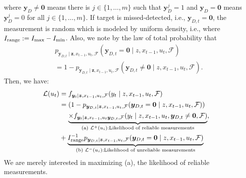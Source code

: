 \documentclass[letterpaper, 10 pt, conference]{ieeeconf}
\newcommand{\rood}[1]{{\color{red}{[#1]}}}
\begin{document}
where $\bm{y}_D \neq \mathbf{0}$ means there is $j \in \lbrace 1,\dots,m \rbrace$ such that $\bm{y}_D^j = 1$ and $\bm{y}_D = \mathbf{0}$ means $\bm{y}_D^j = 0$ for all $j \in \lbrace 1,\dots,m \rbrace$. 
If target is missed-detected, i.e., $\bm{y}_{D,t} =\bm{0}$, the measurement is random which is modeled by uniform density, i.e.,
\rood{
\begin{align*}
&f_{\bm{y}_t \mid \bm{z},x_{t-1},u_t,\bm{y}_{D,t},\mathcal{F}}(y_t \mid z,x_{t-1},u_t,\bm{y}_{D,t}=\mathbf{0},\mathcal{F}) \\
&=f_{\bm{y}_t \mid \bm{z},x_{t-1},u_t,\bm{y}_{D,t}}(y_t \mid z,x_{t-1},u_t,\bm{y}_{D,t}=\mathbf{0})\\
&= I_{\textup{range}}^{-1}
\end{align*}
}
where $I_{\textup{range}} := I_{\max} - I_{\min}$. Also, we note by the law of total probability that 
\begin{align*}
&p_{\bm{y}_{D,t} \mid \bm{z},x_{t-1},u_t,\mathcal{F}}(\bm{y}_{D,t} =\mathbf{0}  \mid z,x_{t-1},u_t,\mathcal{F}) \\
&= 1-p_{\bm{y}_{D,t} \mid \bm{z},x_{t-1},u_t,\mathcal{F}}(\bm{y}_{D,t} \neq \mathbf{0} \mid z,x_{t-1},u_t,\mathcal{F}).
\end{align*}
Then, we have:
\begin{align}
\mathcal{L}(u_t)&=f_{\bm{y}_t \mid \bm{z},x_{t-1},u_t,\mathcal{F}}(y_t \mid z,x_{t-1},u_t,\mathcal{F}) \nonumber \\
&=(1-p_{\bm{y}_{D,t} \mid \bm{z},x_{t-1},u_t,\mathcal{F}}(\bm{y}_{D,t} = \mathbf{0} \mid z,x_{t-1},u_t,\mathcal{F})) \nonumber \\
&\,\,\,\,\,\,\,\underbrace{\times f_{\bm{y}_t \mid \bm{z},x_{t-1},u_t\bm{y}_{D,t},\mathcal{F}}(y_t \mid z,x_{t-1},u_t,\bm{y}_{D,t}\neq \mathbf{0},\mathcal{F})}_{\textup{(a) } \mathcal{L}^+(u_i): \textup{Likelihood of reliable measurements}}, \nonumber \\
&+\underbrace{I_{\textup{range}}^{-1}p_{\bm{y}_{D,t} \mid \bm{z},x_{t-1},u_t,\mathcal{F}}(\bm{y}_{D,t} = \mathbf{0} \mid z,x_{t-1},u_t,\mathcal{F})}_{\textup{(b) } \mathcal{L}^-(u_i): \textup{Likelihood of unreliable measurements}}
\label{eq10}
\end{align}
We are merely interested in maximizing (a), the likelihood of reliable measurements.
\end{document}
